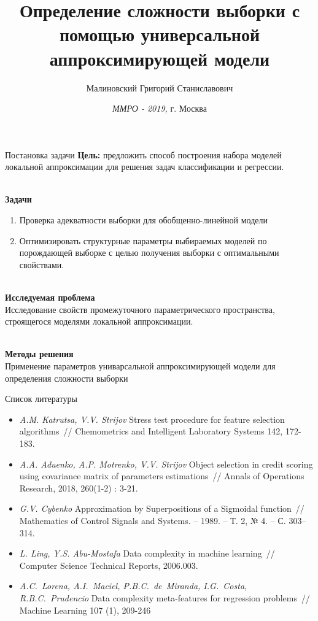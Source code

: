 \documentclass[10pt,pdf,hyperref={unicode}]{beamer}
\title[\hbox to 56mm{Определение сложности выборки \hfill\insertframenumber\,/\,\inserttotalframenumber}]
{Определение сложности выборки с помощью универсальной аппроксимирующей модели}
\author[Малиновский Г. С.]{\Large Малиновский Григорий Станиславович}
\institute{ Московский физико-технический институт\\
Факультет управления и прикладной математики\\
Кафедра интеллектуальных систем\\

}
\date{\footnotesize{\emph{ММРО - 2019, }г. Москва }}
\begin{document}
\begin{frame}
\titlepage
\end{frame}

\begin{frame}{Постановка задачи}
\justifying
\textbf{Цель:} предложить способ построения набора моделей локальной аппроксимации для решения задач классификации и регрессии.

~\\
\textbf{Задачи}

\begin{enumerate}
	\justifying
	\item Проверка адекватности выборки для обобщенно-линейной модели
	\item Оптимизировать структурные параметры выбираемых моделей по порождающей выборке с целью получения выборки с оптимальными свойствами.

\end{enumerate}

~\\
\textbf{Исследуемая проблема}
	\justifying
	~\\
	Исследование свойств промежуточного параметрического пространства, строящегося моделями локальной аппроксимации. 
	
~\\
\textbf{Методы решения}
\justifying
~\\
Применение параметров униварсальной аппроксимирующей модели для определения сложности выборки





\end{frame}

\begin{frame}{Список литературы}
\begin{itemize}
	\justifying
	\item \textit{A.M. Katrutsa, V.V. Strijov} Stress test procedure for feature selection algorithms~// Chemometrics and Intelligent Laboratory Systems 142, 172-183.
	
	\item \textit{A.A. Aduenko, A.P. Motrenko, V.V. Strijov} Object selection in credit scoring using covariance matrix of parameters estimations~// Annals of Operations Research, 2018, 260(1-2) : 3-21.
	
	\item	\textit{G.V. Cybenko} Approximation by Superpositions of a Sigmoidal function~// Mathematics of Control Signals and Systems. -- 1989. -- Т. 2, № 4. -- С. 303--314.
	
	\item \textit{L. Ling, Y.S. Abu-Mostafa} Data complexity in machine learning~// Computer Science Technical Reports, 2006.003.
	
	\item \textit{A.C.~Lorena, A.I.~Maciel, P.B.C.~de~Miranda, I.G.~Costa, R.B.C.~Prudencio} Data complexity meta-features for regression problems~// Machine Learning 107 (1), 209-246
	
	
\end{itemize}
\end{frame}
\end{document}
